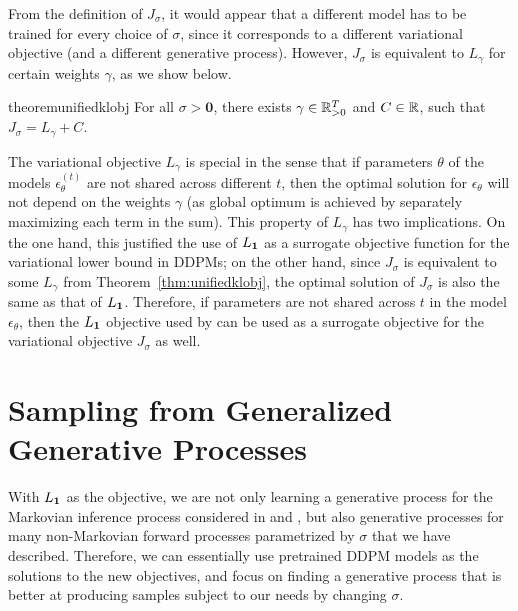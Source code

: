 From the definition of $J_\sigma$, it would appear that a different model has to be trained for every choice of $\sigma$, since it corresponds to a different variational objective (and a different generative process). %
However, $J_\sigma$ is equivalent to $L_\gamma$ for certain weights $\gamma$, as we show below.
\begin{restatable}{theorem}{unifiedklobj}
\label{thm:unifiedklobj}
For all $\sigma > \bm{0}$, there exists $\gamma \in \mathbb{R}_{> 0}^{T}$ and $C \in \mathbb{R}$, such that $J_\sigma = L_\gamma + C$.
\end{restatable}
The variational objective $L_\gamma$ is special in the sense that if parameters $\theta$ %
of the models $\epsilon_\theta^{(t)}$ %
are not shared across different $t$, then the optimal solution for $\epsilon_\theta$ will not depend on the weights $\gamma$ (as global optimum is achieved by separately maximizing each term in the sum). 
This property of $L_\gamma$ has two implications. %
On the one hand, this justified the use of $L_{\bm{1}}$ as a surrogate objective function for the variational lower bound in DDPMs; on the other hand, since $J_\sigma$ is equivalent to some $L_\gamma$ from Theorem~\ref{thm:unifiedklobj}, the optimal solution of $J_\sigma$ is also the same as that of $L_{\bm{1}}$. %
Therefore, if parameters are not shared across $t$ in the model $\epsilon_\theta$, then the $L_{\bm{1}}$ objective used by \citet{ho2020denoising} can be used as a surrogate objective for the variational objective $J_\sigma$ as well. 




\section{Sampling from Generalized Generative Processes}\label{sec:sampling}
With $L_{\bm{1}}$ as the objective, we are not only learning a generative process for the Markovian inference process considered in \citet{sohl-dickstein2015deep} and \citet{ho2020denoising}, but also generative processes for many non-Markovian forward processes parametrized by $\sigma$ %
that we have described. Therefore, we can essentially use pretrained DDPM models as the solutions to the new objectives, and focus on finding a generative process that is better at producing samples subject to our needs by changing $\sigma$. %
